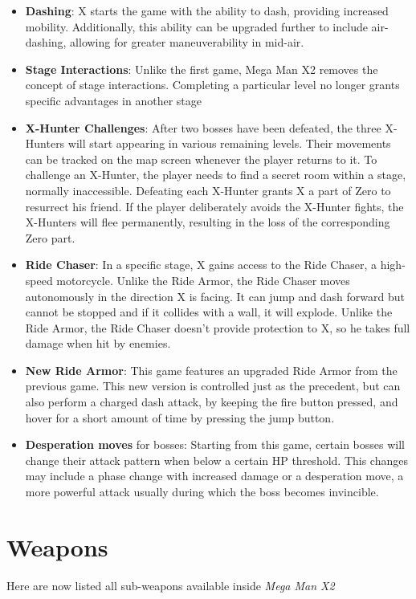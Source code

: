 \begin{itemize}
	\item \textbf{Dashing}: X starts the game with the ability to dash, providing increased mobility. Additionally, this ability can be upgraded further to include air-dashing, allowing for greater maneuverability in mid-air.
	\item \textbf{Stage Interactions}: Unlike the first game, Mega Man X2 removes the concept of stage interactions. Completing a particular level no longer grants specific advantages in another stage
	\item\textbf{ X-Hunter Challenges}: After two bosses have been defeated, the three X-Hunters will start appearing in various remaining levels. Their movements can be tracked on the map screen whenever the player returns to it. To challenge an X-Hunter, the player needs to find a secret room within a stage, normally inaccessible. Defeating each X-Hunter grants X a part of Zero to resurrect his friend. If the player deliberately avoids the X-Hunter fights, the X-Hunters will flee permanently, resulting in the loss of the corresponding Zero part. 
	\item \textbf{Ride Chaser}: In a specific stage, X gains access to the Ride Chaser, a high-speed motorcycle. Unlike the Ride Armor, the Ride Chaser moves autonomously in the direction X is facing. It can jump and dash forward but cannot be stopped and if it collides with a wall, it will explode. Unlike the Ride Armor, the Ride Chaser doesn't provide protection to X, so he takes full damage when hit by enemies.
	\item \textbf{New Ride Armor}: This game features an upgraded Ride Armor from the previous game. This new version is controlled just as the precedent, but can also perform a charged dash attack, by keeping the fire button pressed, and hover for a short amount of time by pressing the jump button.
	\item \textbf{Desperation moves} for bosses: Starting from this game, certain bosses will change their attack pattern when below a certain HP threshold. This changes may include a phase change with increased damage or a desperation move, a more powerful attack usually during which the boss becomes invincible.
\end{itemize}

\section{Weapons}\label{X2:sub_weapon}
Here are now listed all sub-weapons available inside \textit{Mega Man X2}~\cite{wiki:X_weapons}

